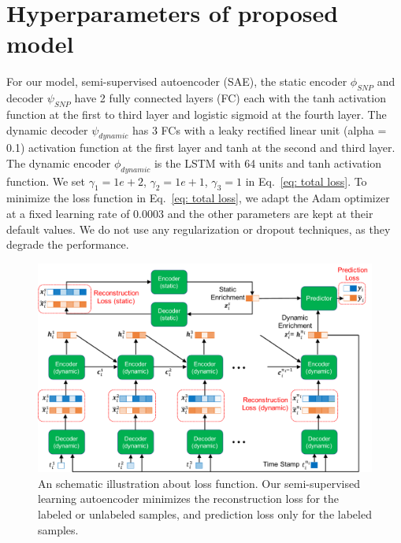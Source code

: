 \section{Hyperparameters of proposed model}
For our model, semi-supervised autoencoder (SAE), the static encoder $\phi_{SNP}$ and decoder $\psi_{SNP}$ have 2 fully connected layers (FC) each with the tanh activation function at the first to third layer and logistic sigmoid at the fourth layer. The dynamic decoder $\psi_{dynamic}$ has 3 FCs with a leaky rectified linear unit (alpha = 0.1) activation function at the first layer and tanh at the second and third layer. The dynamic encoder $\phi_{dynamic}$ is the LSTM with 64 units and tanh activation function. We set $\gamma_1 = 1e+2$, $\gamma_2 = 1e+1$, $\gamma_3 = 1$ in Eq.~\eqref{eq: total loss}.
To minimize the loss function in Eq.~\eqref{eq: total loss}, we adapt the Adam optimizer~\cite{kingma2014adam} at a fixed learning rate of 0.0003 and the other parameters are kept at their default values. We do not use any regularization or dropout techniques, as they degrade the performance.


\begin{figure}
    \includegraphics[width=\textwidth]{images/objective.pdf}
    \caption{An schematic illustration about loss function. Our semi-supervised learning autoencoder minimizes the reconstruction loss for the labeled or unlabeled samples, and prediction loss only for the labeled samples.} \label{fig: objective}
\end{figure}

